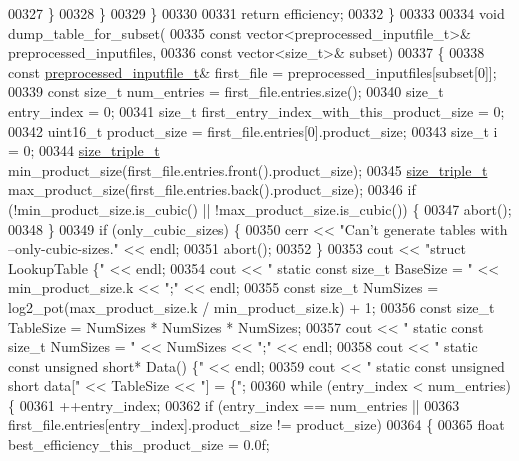 \begin{DoxyCode}
{{00327       \}
00328     \}
00329   \}
00330 
00331   \textcolor{keywordflow}{return} efficiency;
00332 \}
00333 
00334 \textcolor{keywordtype}{void} dump\_table\_for\_subset(
00335         \textcolor{keyword}{const} vector<preprocessed\_inputfile\_t>& preprocessed\_inputfiles,
00336         \textcolor{keyword}{const} vector<size\_t>& subset)
00337 \{
00338   \textcolor{keyword}{const} \hyperlink{structpreprocessed__inputfile__t}{preprocessed\_inputfile\_t}& first\_file = preprocessed\_inputfiles[subset[0]];
00339   \textcolor{keyword}{const} \textcolor{keywordtype}{size\_t} num\_entries = first\_file.entries.size();
00340   \textcolor{keywordtype}{size\_t} entry\_index = 0;
00341   \textcolor{keywordtype}{size\_t} first\_entry\_index\_with\_this\_product\_size = 0;
00342   uint16\_t product\_size = first\_file.entries[0].product\_size;
00343   \textcolor{keywordtype}{size\_t} i = 0;
00344   \hyperlink{structsize__triple__t}{size\_triple\_t} min\_product\_size(first\_file.entries.front().product\_size);
00345   \hyperlink{structsize__triple__t}{size\_triple\_t} max\_product\_size(first\_file.entries.back().product\_size);
00346   \textcolor{keywordflow}{if} (!min\_product\_size.is\_cubic() || !max\_product\_size.is\_cubic()) \{
00347     abort();
00348   \}
00349   \textcolor{keywordflow}{if} (only\_cubic\_sizes) \{
00350     cerr << \textcolor{stringliteral}{"Can't generate tables with --only-cubic-sizes."} << endl;
00351     abort();
00352   \}
00353   cout << \textcolor{stringliteral}{"struct LookupTable \{"} << endl;
00354   cout << \textcolor{stringliteral}{"  static const size\_t BaseSize = "} << min\_product\_size.k << \textcolor{stringliteral}{";"} << endl;
00355   \textcolor{keyword}{const} \textcolor{keywordtype}{size\_t} NumSizes = log2\_pot(max\_product\_size.k / min\_product\_size.k) + 1;
00356   \textcolor{keyword}{const} \textcolor{keywordtype}{size\_t} TableSize = NumSizes * NumSizes * NumSizes;
00357   cout << \textcolor{stringliteral}{"  static const size\_t NumSizes = "} << NumSizes << \textcolor{stringliteral}{";"} << endl;
00358   cout << \textcolor{stringliteral}{"  static const unsigned short* Data() \{"} << endl;
00359   cout << \textcolor{stringliteral}{"    static const unsigned short data["} << TableSize << \textcolor{stringliteral}{"] = \{"};
00360   \textcolor{keywordflow}{while} (entry\_index < num\_entries) \{
00361     ++entry\_index;
00362     \textcolor{keywordflow}{if} (entry\_index == num\_entries ||
00363         first\_file.entries[entry\_index].product\_size != product\_size)
00364     \{
00365       \textcolor{keywordtype}{float} best\_efficiency\_this\_product\_size = 0.0f;
}}
\end{DoxyCode}
